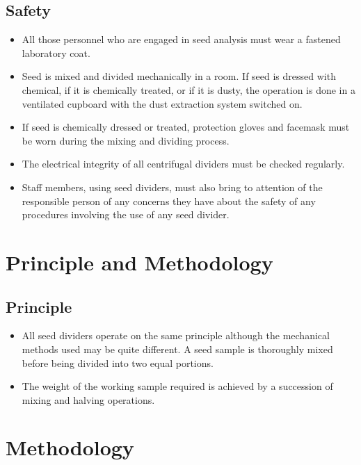 \documentclass[]{book}
\providecommand{\tightlist}{%
  \setlength{\itemsep}{0pt}\setlength{\parskip}{0pt}}
\begin{document}
\subsection{Safety}\label{safety}

\begin{itemize}
\tightlist
\item
  All those personnel who are engaged in seed analysis must wear a
  fastened laboratory coat.
\item
  Seed is mixed and divided mechanically in a room. If seed is dressed
  with chemical, if it is chemically treated, or if it is dusty, the
  operation is done in a ventilated cupboard with the dust extraction
  system switched on.
\item
  If seed is chemically dressed or treated, protection gloves and
  facemask must be worn during the mixing and dividing process.
\item
  The electrical integrity of all centrifugal dividers must be checked
  regularly.
\item
  Staff members, using seed dividers, must also bring to attention of
  the responsible person of any concerns they have about the safety of
  any procedures involving the use of any seed divider.
\end{itemize}

\section{Principle and Methodology}\label{principle-and-methodology}

\subsection{Principle}\label{principle-3}

\begin{itemize}
\tightlist
\item
  All seed dividers operate on the same principle although the
  mechanical methods used may be quite different. A seed sample is
  thoroughly mixed before being divided into two equal portions.
\item
  The weight of the working sample required is achieved by a succession
  of mixing and halving operations.
\end{itemize}

\section{Methodology}\label{methodology}
\end{document}
